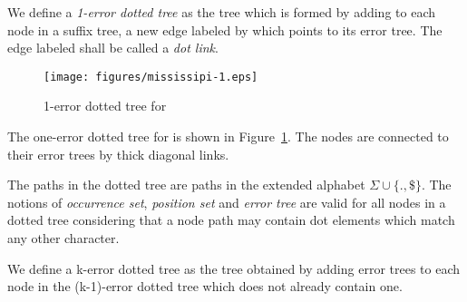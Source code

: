 \begin{definition}
We define a \emph{1-error dotted tree} as the tree which is formed by adding to each node in a suffix tree, a new edge labeled by  which points to its error tree. The edge labeled  shall be called a \emph{dot link}.
\end{definition}

\begin{figure} 
\texttt{[image: figures/mississipi-1.eps]}
\caption{1-error dotted tree for }%
\label{fig:mississipi-1}
\end{figure}


The one-error dotted tree for  is shown in Figure~\ref{fig:mississipi-1}. The nodes are connected to their error trees by thick diagonal links.

The paths in the dotted tree are paths in the extended alphabet $\Sigma\cup\{.,\$\}$. The notions of \emph{occurrence set}, \emph{position set} and \emph{error tree} are valid for all nodes in a dotted tree considering that a node path may contain dot elements which match any other character.

\begin{definition}
We define a k-error dotted tree as the tree obtained by adding error trees to each node in the (k-1)-error dotted tree which does not already contain one.
\end{definition}


